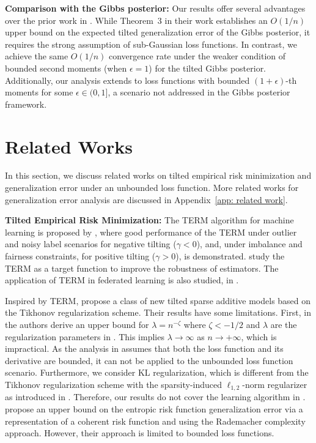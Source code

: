 \documentclass{article}
\theoremstyle{plain}
\theoremstyle{plain}
\theoremstyle{definition}
\theoremstyle{remark}
\begin{document}
\textbf{Comparison with the Gibbs posterior:} Our results offer several advantages over the prior work in \citet{aminian2021exact}. While Theorem~3 in their work establishes an $O(1/n)$ upper bound on the expected tilted generalization error of the Gibbs posterior, it requires the strong assumption of sub-Gaussian loss functions. In contrast, we achieve the same $O(1/n)$ convergence rate under the weaker condition of bounded second moments (when $\epsilon=1$) for the tilted Gibbs posterior. Additionally, our analysis extends to loss functions with bounded $(1+\epsilon)$-th moments for some $\epsilon\in(0,1]$, a scenario not addressed in the Gibbs posterior framework.

 \section{Related Works} \label{sec:related}
In this section, we discuss related works on tilted empirical risk minimization and generalization error under an unbounded loss function. More related works for generalization error analysis are discussed in Appendix~\ref{app: related work}.

\textbf{Tilted Empirical Risk Minimization:} The TERM algorithm for machine learning is proposed by \citet{li2020tilted}, %
where good performance of the TERM under outlier and noisy label scenarios for negative tilting ($\gamma<0$), and, under imbalance and fairness constraints, for positive tilting ($\gamma>0$), is demonstrated. \citet{zhang2023robust} study the TERM as a target function to improve the robustness of estimators. The application of TERM in federated learning is also studied,  in \citet{li2023heterogeneity,zhang2022proportional}. 

Inspired by TERM, \citet{wang2023tilted} propose a class of new tilted sparse additive models based on the Tikhonov regularization scheme.  Their results have some limitations.
First, in \citep[Theorem~3.3]{wang2023tilted} the authors derive an upper bound for $\lambda=n^{-\zeta}$ where $\zeta<-1/2$ and $\lambda$ are the regularization parameters in \citep[Eq.4]{wang2023tilted}. This implies $\lambda\rightarrow\infty$ as $n\rightarrow+\infty$, which is impractical.
As the analysis in \citep{wang2023tilted} assumes that both the loss function and its derivative are bounded, %
it can not be applied to the unbounded loss function scenario.
Furthermore, we consider KL regularization, which is different from the Tikhonov regularization scheme with the sparsity-induced $\ell_{1,2}$-norm regularizer as introduced in \citet{wang2023tilted}. Therefore, our %
results do not cover the learning algorithm in  \citet{wang2023tilted}. 
 \citet{lee2020learning} propose an upper bound on the
 entropic risk function generalization error via
 a representation of a coherent risk function and using the Rademacher complexity approach. However, their approach is limited to bounded loss functions.
 
\end{document}
